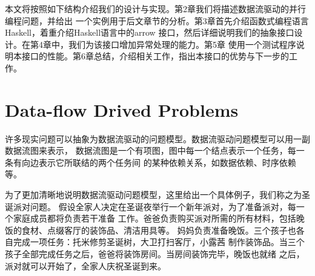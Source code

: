 \documentclass[conference]{IEEEtran}
\begin{document}
本文将按照如下结构介绍我们的设计与实现。第2章我们将描述数据流驱动的并行编程问题，并给出
一个实例用于后文章节的分析。第3章首先介绍函数式编程语言Haskell，着重介绍Haskell语言中的arrow
接口，然后详细说明我们的抽象接口设计。在第4章中，我们为该接口增加异常处理的能力。第5章
使用一个测试程序说明本接口的性能。第6章总结，介绍相关工作，指出本接口的优势与下一步的工作。

\section{Data-flow Drived Problems}\label{sec:dataflow-drived-problems}
许多现实问题可以抽象为数据流驱动的问题模型。数据流驱动问题模型可以用一副数据流图来表示，
数据流图是一个有项图，图中每一个结点表示一个任务，每一条有向边表示它所联结的两个任务间
的某种依赖关系，如数据依赖、时序依赖等。

为了更加清晰地说明数据流驱动问题模型，这里给出一个具体例子，我们称之为圣诞派对问题。
假设全家人决定在圣诞夜举行一个新年派对，为了准备派对，每一个家庭成员都将负责若干准备
工作。爸爸负责购买派对所需的所有材料，包括晚饭的食材、点缀客厅的装饰品、清洁用具等。
妈妈负责准备晚饭。三个孩子也各自完成一项任务：托米修剪圣诞树，大卫打扫客厅，小露茜
制作装饰品。当三个孩子全部完成任务之后，爸爸将装饰房间。当房间装饰完毕，晚饭也就绪
之后，派对就可以开始了，全家人庆祝圣诞到来。
\end{document}
